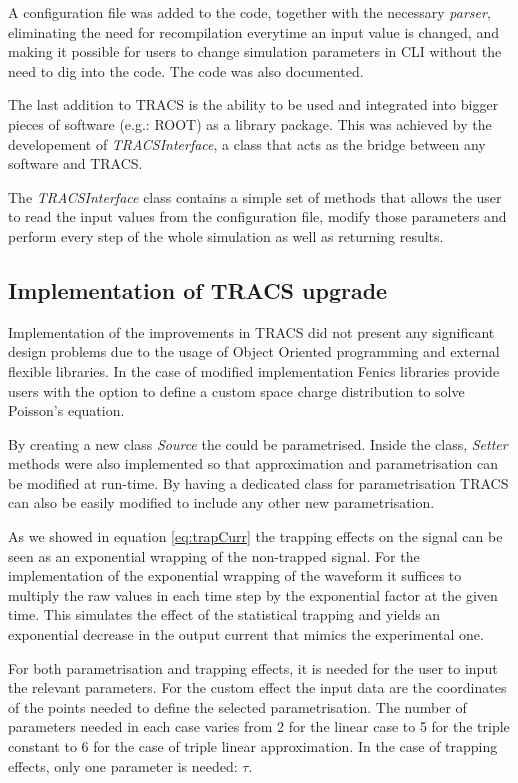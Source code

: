A configuration file was added to the code, together with the necessary \textit{parser}, eliminating the need for recompilation everytime an input value is changed, and making it possible for users to change simulation parameters in CLI without the need to dig into the code. The code was also documented.

The last addition to TRACS is the ability to be used and integrated into bigger pieces of software (e.g.: ROOT) as a library package. This was achieved by the developement of \textit{TRACSInterface}, a class that acts as the bridge between any software and TRACS.

The \textit{TRACSInterface} class contains a simple set of methods that allows the user to read the input values from the configuration file, modify those parameters and perform every step of the whole simulation as well as returning results.

\subsection{Implementation of TRACS upgrade}

Implementation of the improvements in TRACS did not present any significant design problems due to the usage of Object Oriented programming and external flexible libraries. In the case of modified \neff implementation Fenics libraries provide users with the option to define a custom space charge distribution to solve Poisson's equation. 

By creating a new class \textit{Source} the \neff could be parametrised. Inside the class, \emph{Setter} methods were also implemented so that \neff approximation and parametrisation can be modified at run-time. By having a dedicated class for \neff parametrisation TRACS can also be easily modified to include any other new parametrisation. 

As we showed in equation \ref{eq:trapCurr} the trapping effects on the signal can be seen as an exponential wrapping of the non-trapped signal. For the implementation of the exponential wrapping of the waveform it suffices to multiply the raw values in each time step by the exponential factor at the given time. This simulates the effect of the statistical trapping and yields an exponential decrease in the output current that mimics the experimental one.

For both \neff parametrisation and trapping effects, it is needed for the user to input the relevant parameters. For the custom \neff effect the input data are the coordinates of the points needed to define the selected \neff parametrisation. The number of parameters needed in each case varies from 2 for the linear case to 5 for the triple constant \neff to 6 for the case of triple linear approximation. In the case of trapping effects, only one parameter is needed: $ \tau $.

